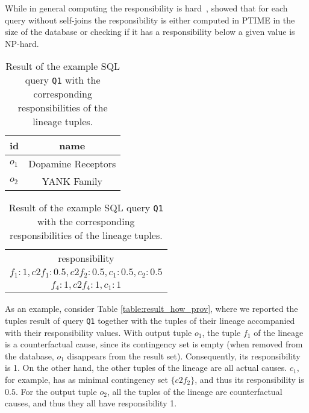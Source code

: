 While in general computing the responsibility is hard~\cite{ChocklerH04}, \citet{MeliouGMS11} showed that for each query without self-joins the responsibility is either computed in PTIME in the size of the database or checking if it has a responsibility below a given value is NP-hard. 

\begin{table}[]
\centering
  \begin{tabular}{|l|c|}
  \hline
    id & name\\
    \hline
    $o_1$ &  Dopamine Receptors\\
    $o_2$ & YANK Family\\
    \hline
  \end{tabular}
  \begin{tabular}{c}
  	responsibility   \\
  	$f_1: 1, c2f_1: 0.5, c2f_2: 0.5, c_1: 0.5, c_2: 0.5$ \\
  	$f_4: 1, c2f_4: 1, c_1: 1$ \\
  \end{tabular}
    \caption{Result of the example SQL query \texttt{Q1} with the corresponding responsibilities of the lineage tuples.}
  \label{table:result_responsibility}
\end{table} 

As an example, consider Table \ref{table:result_how_prov}, where we reported the tuples result of query \texttt{Q1} together with the tuples of their lineage accompanied with their responsibility values. 
With output tuple $o_1$, the tuple $f_1$ of the lineage is a counterfactual cause, since its contingency set is empty (when removed from the database, $o_1$ disappears from the result set). Consequently, its responsibility is 1. On the other hand, the other tuples of the lineage are all actual causes. $c_1$, for example, has as minimal contingency set $\{c2f_2\}$, and thus its responsibility is $0.5$. 
For the output tuple $o_2$, all the tuples of the lineage are counterfactual causes, and thus they all have responsibility 1.






